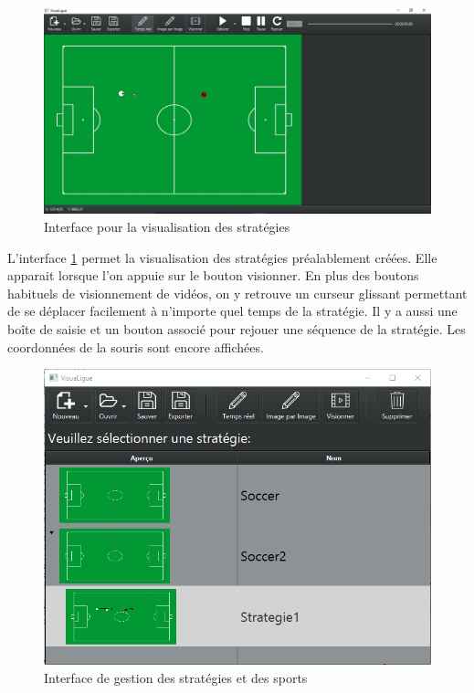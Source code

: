 \begin{figure}[htpb]
    \centering
    \includegraphics[scale=0.6]{fig/gui/mediaContent.png}
    \caption{Interface pour la visualisation des stratégies}
    \label{fig:gui:mediaContent}
\end{figure}

L'interface \ref{fig:gui:mediaContent} permet la visualisation des stratégies préalablement créées.
Elle apparait lorsque l'on appuie sur le bouton visionner.
En plus des boutons habituels de visionnement de vidéos, on y retrouve un curseur glissant permettant de se déplacer facilement à n'importe quel temps de la stratégie.
Il y a aussi une boîte de saisie et un bouton associé pour rejouer une séquence de la stratégie.
Les coordonnées de la souris sont encore affichées.

\begin{figure}[htpb]
    \centering
    \includegraphics[scale=0.6]{fig/gui/openStrategy.png}
    \caption{Interface de gestion des stratégies et des sports}
    \label{fig:gui:openStrategy}
\end{figure}

